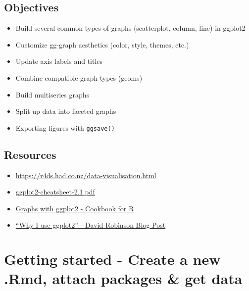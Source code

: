 \documentclass[]{book}
\providecommand{\tightlist}{%
  \setlength{\itemsep}{0pt}\setlength{\parskip}{0pt}}
\begin{document}
\hypertarget{objectives-2}{%
\subsection{Objectives}\label{objectives-2}}

\begin{itemize}
\tightlist
\item
  Build several common types of graphs (scatterplot, column, line) in ggplot2
\item
  Customize gg-graph aesthetics (color, style, themes, etc.)
\item
  Update axis labels and titles
\item
  Combine compatible graph types (geoms)
\item
  Build multiseries graphs
\item
  Split up data into faceted graphs
\item
  Exporting figures with \texttt{ggsave()}
\end{itemize}

\hypertarget{resources-3}{%
\subsection{Resources}\label{resources-3}}

\begin{itemize}
\tightlist
\item
  \href{Chapter\%203\%20-\%20Data\%20Visualization\%20in\%20R\%20for\%20Data\%20Science\%20by\%20Grolemund\%20and\%20Wickham}{https://r4ds.had.co.nz/data-visualisation.html}
\item
  \href{https://www.rstudio.com/wp-content/uploads/2016/11/ggplot2-cheatsheet-2.1.pdf}{ggplot2-cheatsheet-2.1.pdf}\\
\item
  \href{http://www.cookbook-r.com/Graphs/\#graphs-with-ggplot2}{Graphs with ggplot2 - Cookbook for R}\\
\item
  \href{http://varianceexplained.org/r/why-I-use-ggplot2/}{``Why I use ggplot2'' - David Robinson Blog Post}
\end{itemize}

\hypertarget{getting-started---create-a-new-.rmd-attach-packages-get-data}{%
\section{Getting started - Create a new .Rmd, attach packages \& get data}\label{getting-started---create-a-new-.rmd-attach-packages-get-data}}
\end{document}

